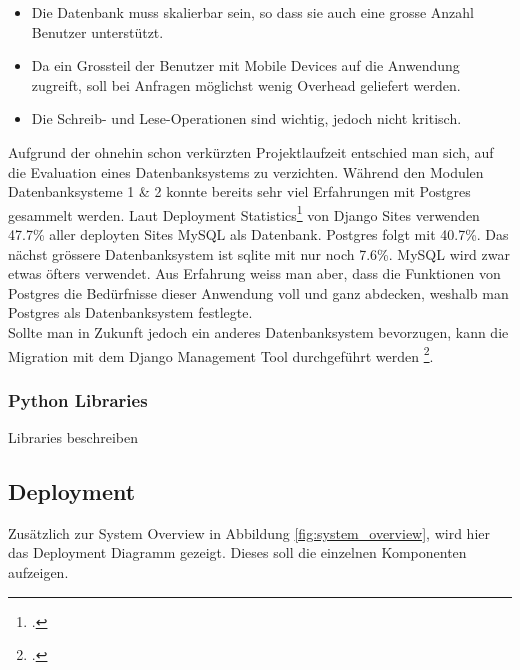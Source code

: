 \begin{itemize}
	\item Die Datenbank muss skalierbar sein, so dass sie auch eine grosse Anzahl Benutzer unterstützt.
	\item Da ein Grossteil der Benutzer mit Mobile Devices auf die Anwendung zugreift, soll bei Anfragen möglichst wenig Overhead geliefert werden.
	\item Die Schreib- und Lese-Operationen sind wichtig, jedoch nicht kritisch. 
\end{itemize}

Aufgrund der ohnehin schon verkürzten Projektlaufzeit entschied man sich, auf die Evaluation eines Datenbanksystems zu verzichten. Während den Modulen Datenbanksysteme 1 \& 2 konnte bereits sehr viel Erfahrungen mit Postgres gesammelt werden. Laut Deployment Statistics\footcite{deploymentstatistics} von Django Sites verwenden 47.7\% aller deployten Sites MySQL als Datenbank. Postgres folgt mit 40.7\%. Das nächst grössere Datenbanksystem ist sqlite mit nur noch 7.6\%.
MySQL wird zwar etwas öfters verwendet. Aus Erfahrung weiss man aber, dass die Funktionen von Postgres die Bedürfnisse dieser Anwendung voll und ganz abdecken, weshalb man Postgres als Datenbanksystem festlegte. \\

Sollte man in Zukunft jedoch ein anderes Datenbanksystem bevorzugen, kann die Migration mit dem Django Management Tool durchgeführt werden \footcite{dbmigration}. 

\subsubsection*{Python Libraries}
Libraries beschreiben


\subsection{Deployment}
Zusätzlich zur System Overview in Abbildung \ref{fig:system_overview}, wird hier das Deployment Diagramm gezeigt. Dieses soll die einzelnen Komponenten aufzeigen.

